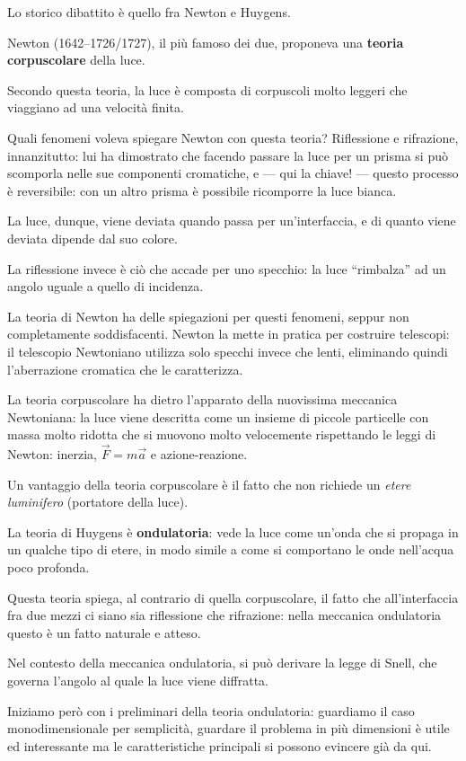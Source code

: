 \documentclass{article}
\begin{document}
Lo storico dibattito è quello fra Newton e Huygens. 

Newton (1642--1726/1727), il più famoso dei due, proponeva una \textbf{teoria corpuscolare} della luce. 

Secondo questa teoria, la luce è composta di corpuscoli molto leggeri che viaggiano ad una velocità finita. 

Quali fenomeni voleva spiegare Newton con questa teoria?
Riflessione e rifrazione, innanzitutto: lui ha dimostrato che facendo passare la luce per un prisma si può scomporla nelle sue componenti cromatiche, e --- qui la chiave! --- questo processo è reversibile: con un altro prisma è possibile ricomporre la luce bianca.

La luce, dunque, viene deviata quando passa per un'interfaccia, e di quanto viene deviata dipende dal suo colore. 

La riflessione invece è ciò che accade per uno specchio: la luce ``rimbalza'' ad un angolo uguale a quello di incidenza.

La teoria di Newton ha delle spiegazioni per questi fenomeni, seppur non completamente soddisfacenti.
Newton la mette in pratica per costruire telescopi: il telescopio Newtoniano utilizza solo specchi invece che lenti, eliminando quindi l'aberrazione cromatica che le caratterizza. 

La teoria corpuscolare ha dietro l'apparato della nuovissima meccanica Newtoniana: la luce viene descritta come un insieme di piccole particelle con massa molto ridotta che si muovono molto velocemente rispettando le leggi di Newton: inerzia, \(\vec{F} = m \vec{a}\) e azione-reazione.

Un vantaggio della teoria corpuscolare è il fatto che non richiede un \emph{etere luminifero} (portatore della luce). 

La teoria di Huygens è \textbf{ondulatoria}: vede la luce come un'onda che si propaga in un qualche tipo di etere, in modo simile a come si comportano le onde nell'acqua poco profonda.

Questa teoria spiega, al contrario di quella corpuscolare, il fatto che all'interfaccia fra due mezzi ci siano sia riflessione che rifrazione: nella meccanica ondulatoria questo è un fatto naturale e atteso.

Nel contesto della meccanica ondulatoria, si può derivare la legge di Snell, che governa l'angolo al quale la luce viene diffratta. 

Iniziamo però con i preliminari della teoria ondulatoria: guardiamo il caso monodimensionale per semplicità, guardare il problema in più dimensioni è utile ed interessante ma le caratteristiche principali si possono evincere già da qui. 
\end{document}
